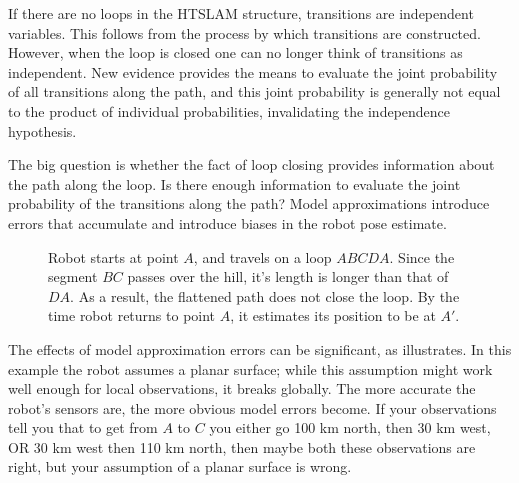 If there are no loops in the HTSLAM structure, transitions are
independent variables. This follows from the process by which
transitions are constructed.  However, when the loop is closed one can
no longer think of transitions as independent. New evidence provides
the means to evaluate the joint probability of all transitions along
the path, and this joint probability is generally not equal to the
product of individual probabilities, invalidating the independence
hypothesis.

The big question is whether the fact of loop closing provides
information about the path along the loop. Is there enough information
to evaluate the joint probability of the transitions along the
path? Model approximations introduce errors that accumulate and
introduce biases in the robot pose estimate.

\begin{figure}[htbp]
  \centering

\caption[Effect of unmodelled environment features on localisation]
{Robot starts at point $A$, and travels on a loop
$ABCDA$. Since the segment $BC$ passes over the hill, it's length
is longer than that of $DA$. As a result, the flattened path does not
close the loop. By the time robot returns to point $A$, it
estimates its position to be at $A'$.}
  \label{fig:hump}
\end{figure}


The effects of model approximation errors can be significant, as
 illustrates. In this example the robot assumes a
planar surface; while this assumption might work well enough for local
observations, it breaks globally. The more accurate the robot's
sensors are, the more obvious model errors become. If your
observations tell you that to get from $A$ to $C$ you either go 100 km
north, then 30 km west, OR 30 km west then 110 km north, then maybe
both these observations are right, but your assumption of a planar
surface is wrong.

